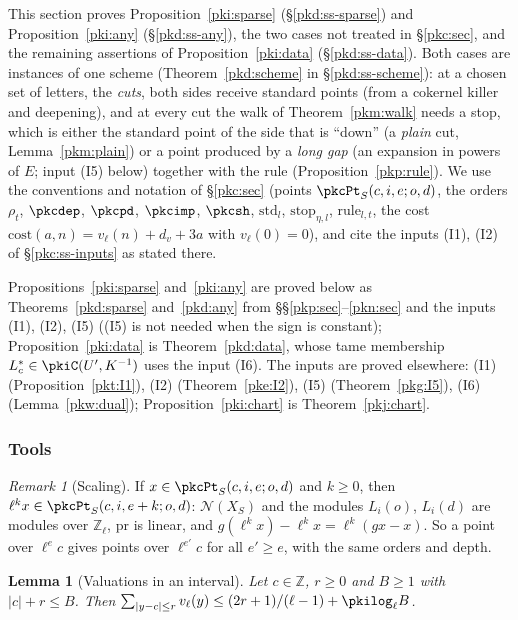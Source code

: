 \documentclass[10pt]{amsart}
\newtheorem{lemma}[theorem]{Lemma}
\theoremstyle{definition}
\theoremstyle{remark}
\newtheorem{remark}[theorem]{Remark}
\newcommand{\Z}{\mathbb Z}
\begin{document}
This section proves Proposition~\ref{pki:sparse} (\S\ref{pkd:ss-sparse}) and
Proposition~\ref{pki:any} (\S\ref{pkd:ss-any}), the two cases not treated in \S\ref{pkc:sec}, and
the remaining assertions of Proposition~\ref{pki:data} (\S\ref{pkd:ss-data}). Both cases are instances of
one scheme (Theorem~\ref{pkd:scheme} in \S\ref{pkd:ss-scheme}): at a chosen set of letters, the
\emph{cuts}, both sides receive standard points (from a cokernel killer and deepening), and at every
cut the walk of Theorem~\ref{pkm:walk} needs a stop, which is either the standard point of the
side that is ``down'' (a \emph{plain} cut, Lemma~\ref{pkm:plain}) or a point produced by a
\emph{long gap} (an expansion in powers of $E$; input (I5) below) together with the rule
(Proposition~\ref{pkp:rule}). We use the conventions and notation of \S\ref{pkc:sec}
(points $\pkcPt_S(c,i,e;o,d)$, the orders $\rho_t$, $\pkcdep$, $\pkcpd$, $\pkcimp$, $\pkcsh$,
$\mathrm{std}_l$, $\mathrm{stop}_{\eta,l}$, $\mathrm{rule}_{l,t}$, the cost
$\mathrm{cost}(a,n)=v_\ell(n)+d_v+3a$ with $v_\ell(0)=0$), and cite the inputs (I1), (I2) of
\S\ref{pkc:ss-inputs} as stated there.

Propositions~\ref{pki:sparse} and~\ref{pki:any} are proved below as Theorems~\ref{pkd:sparse}
and~\ref{pkd:any} from \S\S\ref{pkp:sec}--\ref{pkn:sec} and the inputs (I1), (I2), (I5)
((I5) is not needed when the sign is constant); Proposition~\ref{pki:data} is Theorem~\ref{pkd:data},
whose tame membership $L_c^*\in\pkiC(U',K^{-1})$ uses the input (I6). The inputs are proved elsewhere: (I1)
(Proposition~\ref{pkt:I1}), (I2) (Theorem~\ref{pke:I2}), (I5) (Theorem~\ref{pkg:I5}), (I6)
(Lemma~\ref{pkw:dual}); Proposition~\ref{pki:chart} is Theorem~\ref{pkj:chart}.

\subsubsection{Tools}\label{pkd:ss-tools}

\begin{remark}[Scaling]\label{pkd:scale}
If $x\in\pkcPt_S(c,i,e;o,d)$ and $k\ge0$, then $\ell^kx\in\pkcPt_S(c,i,e+k;o,d)$: $\mathcal N(X_S)$
and the modules $L_i(o)$, $L_i(d)$ are modules over $\Z_\ell$, $\mathrm{pr}$ is linear, and
$g(\ell^kx)-\ell^kx=\ell^k(gx-x)$. So a point over $\ell^ec$ gives points over $\ell^{e'}c$ for all
$e'\ge e$, with the same orders and depth.
\end{remark}

\begin{lemma}[Valuations in an interval]\label{pkd:val}
Let $c\in\Z$, $r\ge0$ and $B\ge1$ with $|c|+r\le B$. Then
$\sum_{|y-c|\le r}v_\ell(y)\le(2r+1)/(\ell-1)+\pkilog_\ell B$.
\end{lemma}
\end{document}
